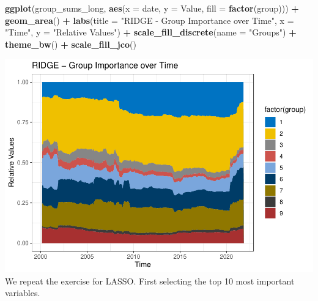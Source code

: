 \documentclass[
]{article}
\newenvironment{Shaded}{\begin{snugshade}}{\end{snugshade}}
\newcommand{\AttributeTok}[1]{\textcolor[rgb]{0.13,0.29,0.53}{#1}}
\newcommand{\FunctionTok}[1]{\textcolor[rgb]{0.13,0.29,0.53}{\textbf{#1}}}
\newcommand{\NormalTok}[1]{#1}
\newcommand{\SpecialCharTok}[1]{\textcolor[rgb]{0.81,0.36,0.00}{\textbf{#1}}}
\newcommand{\StringTok}[1]{\textcolor[rgb]{0.31,0.60,0.02}{#1}}
\begin{document}
\begin{Shaded}
\begin{Highlighting}[]
\FunctionTok{ggplot}\NormalTok{(group\_sums\_long, }\FunctionTok{aes}\NormalTok{(}\AttributeTok{x =}\NormalTok{ date, }\AttributeTok{y =}\NormalTok{ Value, }\AttributeTok{fill =} \FunctionTok{factor}\NormalTok{(group))) }\SpecialCharTok{+}
  \FunctionTok{geom\_area}\NormalTok{() }\SpecialCharTok{+}
  \FunctionTok{labs}\NormalTok{(}\AttributeTok{title =} \StringTok{"RIDGE {-} Group Importance over Time"}\NormalTok{, }\AttributeTok{x =} \StringTok{"Time"}\NormalTok{, }\AttributeTok{y =} \StringTok{"Relative Values"}\NormalTok{) }\SpecialCharTok{+}
  \FunctionTok{scale\_fill\_discrete}\NormalTok{(}\AttributeTok{name =} \StringTok{"Groups"}\NormalTok{) }\SpecialCharTok{+}
  \FunctionTok{theme\_bw}\NormalTok{() }\SpecialCharTok{+} 
  \FunctionTok{scale\_fill\_jco}\NormalTok{()}
\end{Highlighting}
\end{Shaded}

\includegraphics{Trabalho_Econo4_Q2_files/figure-latex/unnamed-chunk-30-1.pdf}
We repeat the exercise for LASSO. First selecting the top 10 most
important variables.
\end{document}
